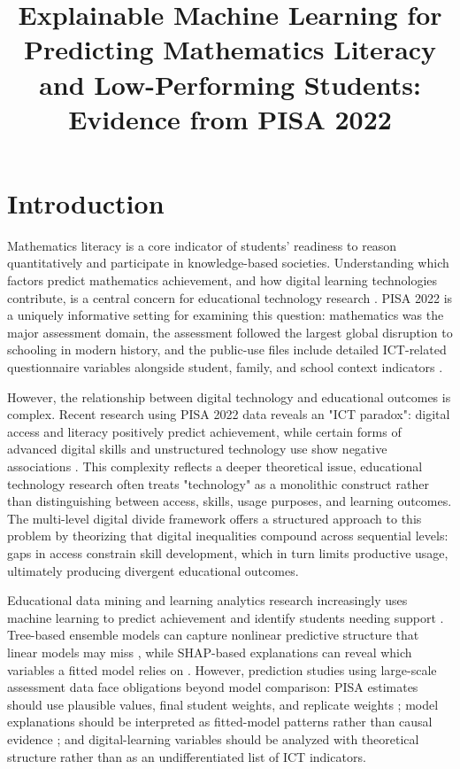 \documentclass[pdflatex,sn-mathphys-ay]{sn-jnl}
\title[XAI for PISA 2022 Mathematics Literacy]{Explainable Machine Learning for Predicting Mathematics Literacy and Low-Performing Students: Evidence from PISA 2022}
\author*[1]{\fnm{Zhiren} \sur{Xiao}}\email{241734106@m.gduf.edu.cn}
\affil*[1]{\orgname{Guangdong University of Finance}, \country{China}}
\begin{document}
\maketitle

\section{Introduction}

Mathematics literacy is a core indicator of students' readiness to reason quantitatively and participate in knowledge-based societies. Understanding which factors predict mathematics achievement, and how digital learning technologies contribute, is a central concern for educational technology research \citep{OECD_2022_results_vol1}. PISA 2022 is a uniquely informative setting for examining this question: mathematics was the major assessment domain, the assessment followed the largest global disruption to schooling in modern history, and the public-use files include detailed ICT-related questionnaire variables alongside student, family, and school context indicators \citep{OECD_2022_results_vol2,OECD_2022_database}.

However, the relationship between digital technology and educational outcomes is complex. Recent research using PISA 2022 data reveals an "ICT paradox": digital access and literacy positively predict achievement, while certain forms of advanced digital skills and unstructured technology use show negative associations \citep{Joshi_2025_digital_literacy,Joshi_2025_digital_resources}. This complexity reflects a deeper theoretical issue, educational technology research often treats "technology" as a monolithic construct rather than distinguishing between access, skills, usage purposes, and learning outcomes. The multi-level digital divide framework \citep{van_Dijk_2005,van_Dijk_2020} offers a structured approach to this problem by theorizing that digital inequalities compound across sequential levels: gaps in access constrain skill development, which in turn limits productive usage, ultimately producing divergent educational outcomes.

Educational data mining and learning analytics research increasingly uses machine learning to predict achievement and identify students needing support \citep{Romero_Ventura_2020,Ifenthaler_Yau_2020}. Tree-based ensemble models can capture nonlinear predictive structure that linear models may miss \citep{Breiman_2001,Fernandez_Delgado_2014}, while SHAP-based explanations can reveal which variables a fitted model relies on \citep{Lundberg_Lee_2017}. However, prediction studies using large-scale assessment data face obligations beyond model comparison: PISA estimates should use plausible values, final student weights, and replicate weights \citep{OECD_2022_technical,Rutkowski_2010}; model explanations should be interpreted as fitted-model patterns rather than causal evidence \citep{Rudin_2019,Molnar_2022}; and digital-learning variables should be analyzed with theoretical structure rather than as an undifferentiated list of ICT indicators.
\end{document}
